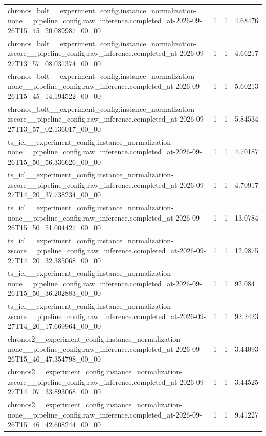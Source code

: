 \begin{tabular}{llll}
chronos\_bolt\_\_experiment\_config.instance\_normalization-none\_\_pipeline\_config.raw\_inference.completed\_at-2026-09-26T15\_45\_20.089987\_00\_00 & 1 & 1 & 4.68476 \\
chronos\_bolt\_\_experiment\_config.instance\_normalization-zscore\_\_pipeline\_config.raw\_inference.completed\_at-2026-09-27T13\_57\_08.031374\_00\_00 & 1 & 1 & 4.66217 \\
chronos\_bolt\_\_experiment\_config.instance\_normalization-none\_\_pipeline\_config.raw\_inference.completed\_at-2026-09-26T15\_45\_14.194522\_00\_00 & 1 & 1 & 5.60213 \\
chronos\_bolt\_\_experiment\_config.instance\_normalization-zscore\_\_pipeline\_config.raw\_inference.completed\_at-2026-09-27T13\_57\_02.136017\_00\_00 & 1 & 1 & 5.84534 \\
ts\_icl\_\_experiment\_config.instance\_normalization-none\_\_pipeline\_config.raw\_inference.completed\_at-2026-09-26T15\_50\_56.336626\_00\_00 & 1 & 1 & 4.70187 \\
ts\_icl\_\_experiment\_config.instance\_normalization-zscore\_\_pipeline\_config.raw\_inference.completed\_at-2026-09-27T14\_20\_37.738234\_00\_00 & 1 & 1 & 4.70917 \\
ts\_icl\_\_experiment\_config.instance\_normalization-none\_\_pipeline\_config.raw\_inference.completed\_at-2026-09-26T15\_50\_51.004427\_00\_00 & 1 & 1 & 13.0784 \\
ts\_icl\_\_experiment\_config.instance\_normalization-zscore\_\_pipeline\_config.raw\_inference.completed\_at-2026-09-27T14\_20\_32.385068\_00\_00 & 1 & 1 & 12.9875 \\
ts\_icl\_\_experiment\_config.instance\_normalization-none\_\_pipeline\_config.raw\_inference.completed\_at-2026-09-26T15\_50\_36.202883\_00\_00 & 1 & 1 & 92.084 \\
ts\_icl\_\_experiment\_config.instance\_normalization-zscore\_\_pipeline\_config.raw\_inference.completed\_at-2026-09-27T14\_20\_17.669964\_00\_00 & 1 & 1 & 92.2423 \\
chronos2\_\_experiment\_config.instance\_normalization-none\_\_pipeline\_config.raw\_inference.completed\_at-2026-09-26T15\_46\_47.354798\_00\_00 & 1 & 1 & 3.44093 \\
chronos2\_\_experiment\_config.instance\_normalization-zscore\_\_pipeline\_config.raw\_inference.completed\_at-2026-09-27T14\_07\_33.893068\_00\_00 & 1 & 1 & 3.44525 \\
chronos2\_\_experiment\_config.instance\_normalization-none\_\_pipeline\_config.raw\_inference.completed\_at-2026-09-26T15\_46\_42.608244\_00\_00 & 1 & 1 & 9.41227 \\

\end{tabular}
